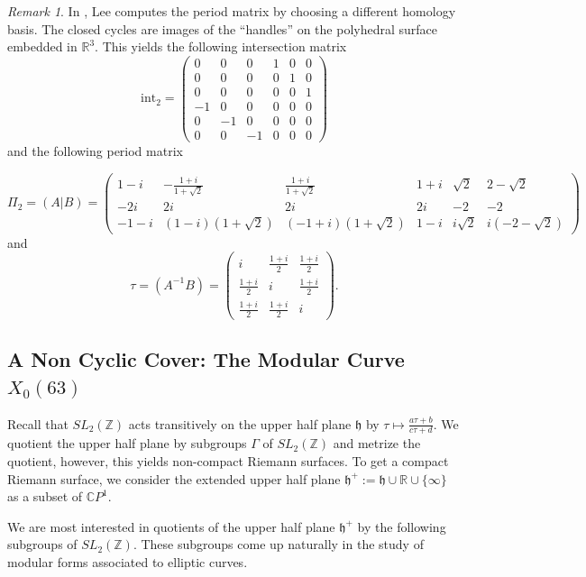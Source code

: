 \documentclass[12pt,reqno]{amsart}
\newcommand{\C}{\mathbb{C}}
\newcommand{\Z}{\mathbb{Z}}
\newcommand{\R}{\mathbb{R}}
\theoremstyle{definition}
\theoremstyle{remark}
\newtheorem*{remark}{Remark}
\begin{document}
\begin{remark} In \cite{dthesis}, Lee computes the period matrix by choosing a different homology basis. The closed cycles are images of the ``handles'' on the polyhedral surface embedded in $\R^3.$ This yields the following intersection matrix 
$$\textrm{int}_2 = \begin{pmatrix} 0 & 0 & 0 & 1 & 0 & 0 \\
 0 & 0 & 0 & 0 & 1 & 0 \\
 0 & 0 & 0 & 0 & 0 & 1 \\
 -1 & 0 & 0 & 0 & 0 & 0 \\
 0 & -1 & 0 & 0 & 0 & 0 \\
 0 & 0 & -1 & 0 & 0 & 0\end{pmatrix}$$ and the following period matrix

$$\Pi_2 = (A|B) = \begin{pmatrix}  1 - i& -\frac{1 + i}{1 + \sqrt{2}}& \frac{1 + i}{1 + \sqrt{2}}& 1 + i& \sqrt{2}& 2 - \sqrt{2} \\  -2i& 2i& 2i& 2i& -2& -2\\ -1 - i & (1 - i)(1 + \sqrt{2})& (-1 + i)(1 + \sqrt{2})& 1 - i& i\sqrt{2}& i(-2 - \sqrt{2})  \end{pmatrix} $$ and $$\tau = (A^{-1}B) = \begin{pmatrix}i & \frac{1 + i}{2} & \frac{1 + i}{2}\\
\frac{1 + i}{2} & i & \frac{1 + i}{2}\\
\frac{1 + i}{2} & \frac{1 + i}{2} & i\end{pmatrix}.$$
\end{remark}



\subsection{A Non Cyclic Cover: The Modular Curve $X_0(63)$}


\label{sec:modular}
Recall that $SL_2(\Z)$ acts transitively on the upper half plane $\mathfrak{h}$ by $\tau \mapsto \frac{a\tau + b}{c\tau + d}$. We quotient the upper half plane by subgroups $\Gamma$ of $SL_2(\Z)$ and metrize the quotient, however, this yields non-compact Riemann surfaces. To get a compact Riemann surface, we consider the extended upper half plane $\mathfrak{h}^{+} := \mathfrak{h} \cup \R \cup \{ \infty \}$ as a subset of $\C P^1$.  

We are most interested in quotients of the upper half plane $\mathfrak{h}^{+}$ by the following subgroups of $SL_2(\Z)$. These subgroups come up naturally in the study of modular forms associated to elliptic curves.
\end{document}
